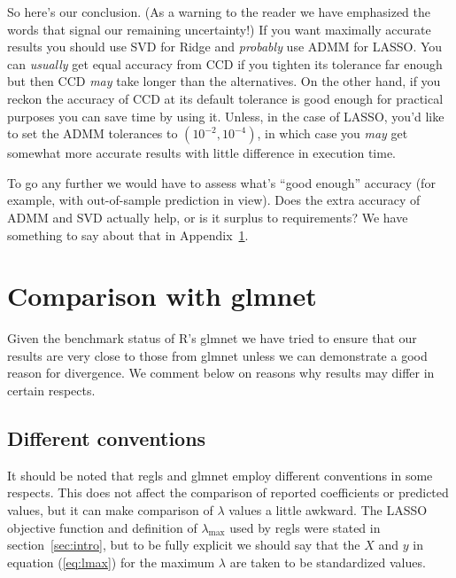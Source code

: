 \documentclass{article}
\newcommand{\myappendix}[1]{%
\addtocounter{appcount}{1}
\section{#1}}
\begin{document}
So here's our conclusion. (As a warning to the reader we have
emphasized the words that signal our remaining uncertainty!)  If you
want maximally accurate results you should use SVD for Ridge and
\textit{probably} use ADMM for LASSO. You can \textit{usually} get
equal accuracy from CCD if you tighten its tolerance far enough but
then CCD \textit{may} take longer than the alternatives. On the other
hand, if you reckon the accuracy of CCD at its default tolerance is
good enough for practical purposes you can save time by using it.
Unless, in the case of LASSO, you'd like to set the ADMM tolerances to
$(10^{-2}, 10^{-4})$, in which case you \textit{may} get somewhat more
accurate results with little difference in execution time.

To go any further we would have to assess what's ``good enough''
accuracy (for example, with out-of-sample prediction in view). Does
the extra accuracy of ADMM and SVD actually help, or is it surplus to
requirements? We have something to say about that in
Appendix~\ref{app:glmnet-comp}.

\myappendix{Comparison with glmnet}
\label{app:glmnet-comp}

Given the benchmark status of \textsf{R}'s \textsf{glmnet} we have
tried to ensure that our results are very close to those from
\textsf{glmnet} unless we can demonstrate a good reason for
divergence. We comment below on reasons why results may differ in
certain respects.

\subsection*{Different conventions}

It should be noted that \textsf{regls} and \textsf{glmnet} employ
different conventions in some respects. This does not affect the
comparison of reported coefficients or predicted values, but it can
make comparison of $\lambda$ values a little awkward. The LASSO
objective function and definition of $\lambda_{\max}$ used by
\textsf{regls} were stated in section~\ref{sec:intro}, but to be fully
explicit we should say that the $X$ and $y$ in equation
(\ref{eq:lmax}) for the maximum $\lambda$ are taken to be standardized
values.
\end{document}
